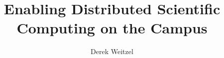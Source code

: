 \documentclass[print]{nuthesis}
\begin{document}
\frontmatter

\title{Enabling Distributed Scientific Computing on the Campus}
\author{Derek Weitzel}
\maketitle
\begin{abstract}

\end{abstract}





\tableofcontents
\listoffigures
\listoftables
\mainmatter



\end{document}

